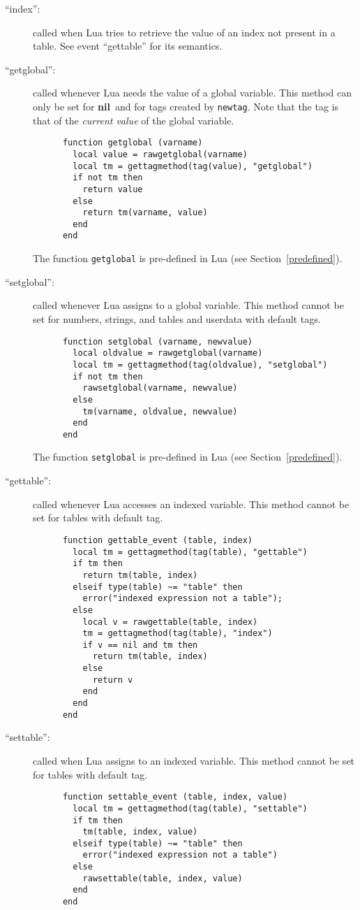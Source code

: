 \documentclass[11pt]{article}
\newcommand{\See}[1]{Section~\ref{#1}}
\newcommand{\see}[1]{(see \See{#1})}
\newcommand{\nil}{{\bf nil}}
\begin{document}
\begin{description}
\item[``index'':]
called when Lua tries to retrieve the value of an index
not present in a table.
See event ``gettable'' for its semantics.

\item[``getglobal'':]
called whenever Lua needs the value of a global variable.
This method can only be set for \nil\ and for tags
created by \verb|newtag|.
Note that
the tag is that of the \emph{current value} of the global variable.
\begin{verbatim}
      function getglobal (varname)
        local value = rawgetglobal(varname)
        local tm = gettagmethod(tag(value), "getglobal")
        if not tm then
          return value
        else
          return tm(varname, value)
        end
      end
\end{verbatim}
The function \verb|getglobal| is pre-defined in Lua \see{predefined}.

\item[``setglobal'':]
called whenever Lua assigns to a global variable.
This method cannot be set for numbers, strings, and tables and
userdata with default tags.
\begin{verbatim}
      function setglobal (varname, newvalue)
        local oldvalue = rawgetglobal(varname)
        local tm = gettagmethod(tag(oldvalue), "setglobal")
        if not tm then
          rawsetglobal(varname, newvalue)
        else
          tm(varname, oldvalue, newvalue)
        end
      end
\end{verbatim}
The function \verb|setglobal| is pre-defined in Lua \see{predefined}.

\item[``gettable'':]
called whenever Lua accesses an indexed variable.
This method cannot be set for tables with default tag.
\begin{verbatim}
      function gettable_event (table, index)
        local tm = gettagmethod(tag(table), "gettable")
        if tm then
          return tm(table, index)
        elseif type(table) ~= "table" then
          error("indexed expression not a table");
        else
          local v = rawgettable(table, index)
          tm = gettagmethod(tag(table), "index")
          if v == nil and tm then
            return tm(table, index)
          else
            return v
          end
        end
      end
\end{verbatim}

\item[``settable'':]
called when Lua assigns to an indexed variable.
This method cannot be set for tables with default tag.
\begin{verbatim}
      function settable_event (table, index, value)
        local tm = gettagmethod(tag(table), "settable")
        if tm then
          tm(table, index, value)
        elseif type(table) ~= "table" then
          error("indexed expression not a table")
        else
          rawsettable(table, index, value)
        end
      end
\end{verbatim}


\end{description}
\end{document}
